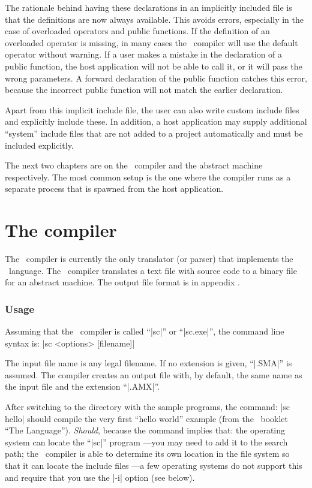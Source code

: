 The rationale behind having these declarations in an implicitly included file is
that the definitions are now always available. This avoids errors, especially in
the case of overloaded operators and public functions. If the definition of an
overloaded operator is missing, in many cases the \Small\ compiler will use the
default operator without warning. If a user makes a mistake in the declaration
of a public function, the host application will not be able to call it, or it
will pass the wrong parameters. A forward declaration of the public function catches
this error, because the incorrect public function will not match the earlier
declaration.

Apart from this implicit include file, the user can also write custom include files
and explicitly include these. In addition, a host application may supply additional
``system'' include files that are not added to a project automatically and must be
included explicitly.

The next two chapters are on the \Small\ compiler and the abstract machine respectively.
The most common setup is the one where the compiler runs as a separate process
that is spawned from the host application.


\chapter{The compiler}
The \Small\ compiler is currently the only translator (or parser) that
implements the \Small\ language. The \Small\ compiler translates a text file with
source code to a binary file for an abstract machine. The output file format
is in appendix .

\subsection{Usage}
Assuming that the \Small\ compiler is called ``|sc|'' or ``|sc.exe|'', the command
line syntax is:
\tabto 35pt |sc <options> [filename]|

The input file name is any legal filename. If no extension is given, ``|.SMA|''
is assumed. The compiler creates an output file with, by default, the same
name as the input file and the extension ``|.AMX|''.

After switching to the directory with the sample programs, the command: \lbreak
\tabto 35pt |sc hello| \lbreak
should compile the very first ``hello world'' example (from the \Small\ booklet
``The Language''). %
{\it Should}, because the command implies that:
\beginlist{1em}\compactlist
\list{\lbullet}
  the operating system can locate the ``|sc|'' program ---you may need to add
  it to the search path;
\list{\lbullet}
  the \Small\ compiler is able to determine its own location in the file system
  so that it can locate the include files ---a few operating systems do not
  support this and require that you use the |-i| option (see below).
\endlist

